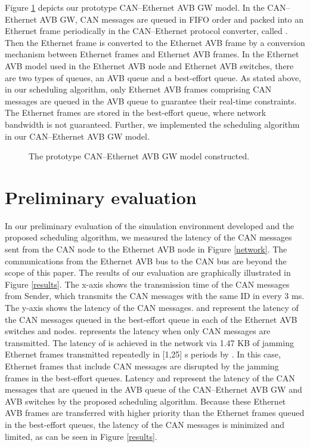 \documentclass{sig-alternate}
\begin{document}
Figure \ref{gw-model} depicts our prototype CAN--Ethernet AVB GW
model. In the CAN--Ethernet AVB GW, CAN messages are queued in FIFO
order and packed into an Ethernet frame periodically in the
CAN--Ethernet protocol converter, called
. Then the Ethernet frame is converted to the
Ethernet AVB frame by a conversion mechanism between Ethernet frames and
Ethernet AVB frames. In the Ethernet AVB model used in the Ethernet AVB
node and Ethernet AVB switches, there are two types of queues, an AVB
queue and a best-effort queue. As stated above, in our scheduling
algorithm, only Ethernet AVB frames comprising CAN messages are queued
in the AVB queue to guarantee their real-time constraints. The Ethernet
frames are stored in the best-effort queue, where network bandwidth is
not guaranteed. Further, we implemented the scheduling algorithm in our
CAN--Ethernet AVB GW model.

\begin{figure}
 \centering
 \caption{The prototype CAN--Ethernet AVB GW model constructed.}
 \label{gw-model}
\end{figure}

\section{Preliminary evaluation}

In our preliminary evaluation of the simulation environment developed
and the proposed scheduling algorithm, we measured the latency of the
CAN messages sent from the CAN node  to the Ethernet AVB
node  in Figure \ref{network}. The communications
from the Ethernet AVB bus to the CAN bus are beyond the scope of this
paper. The results of our evaluation are graphically illustrated in
Figure \ref{results}. The x-axis shows the transmission time of the CAN
messages from Sender, which transmits the CAN messages with the same ID
in every 3 ms. The y-axis shows the latency of the CAN
messages.  and  represent the latency
of the CAN messages queued in the best-effort queue in each of the
Ethernet AVB switches and nodes.  represents the
latency when only CAN messages are transmitted. The latency of
 is achieved in the network via 1.47 KB of jamming
Ethernet frames transmitted repeatedly in [1,25] s periods by
. In this case, Ethernet frames that include CAN
messages are disrupted by the jamming frames in the best-effort
queues. Latency  and  represent the
latency of the CAN messages that are queued in the AVB queue of the
CAN--Ethernet AVB GW and AVB switches by the proposed scheduling
algorithm. Because these Ethernet AVB frames are transferred with higher
priority than the Ethernet frames queued in the best-effort queues, the
latency of the CAN messages is minimized and limited, as can be seen in
Figure \ref{results}.
\end{document}
